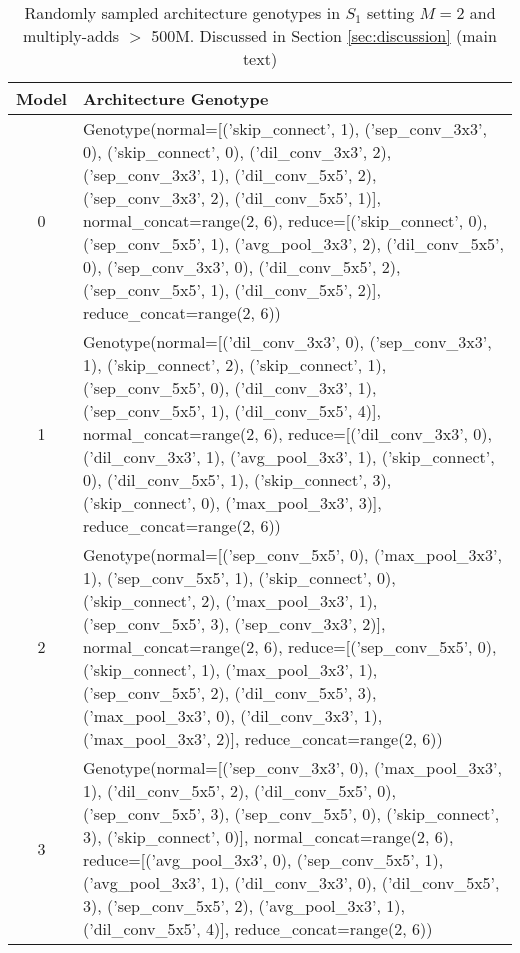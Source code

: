 \documentclass[runningheads]{llncs}
\begin{document}
\begin{table*}
	\begin{center}
		\caption{Randomly sampled architecture genotypes in $S_1$ setting $M=2$ and multiply-adds $>$ 500M. Discussed in Section \ref{sec:discussion} (main text)}
		\label{tab:random-m2500flops}
		\begin{footnotesize}
			\begin{tabular}{cp{11cm}}  
				\hline
				Model & Architecture Genotype  \\
				\hline
				0 & Genotype(normal=[('skip\_connect', 1), ('sep\_conv\_3x3', 0), ('skip\_connect', 0), ('dil\_conv\_3x3', 2), ('sep\_conv\_3x3', 1), ('dil\_conv\_5x5', 2), ('sep\_conv\_3x3', 2), ('dil\_conv\_5x5', 1)], normal\_concat=range(2, 6),
				reduce=[('skip\_connect', 0), ('sep\_conv\_5x5', 1), ('avg\_pool\_3x3', 2), ('dil\_conv\_5x5', 0), ('sep\_conv\_3x3', 0), ('dil\_conv\_5x5', 2), ('sep\_conv\_5x5', 1), ('dil\_conv\_5x5', 2)], reduce\_concat=range(2, 6))
				
				\\
				1 &  Genotype(normal=[('dil\_conv\_3x3', 0), ('sep\_conv\_3x3', 1), ('skip\_connect', 2), ('skip\_connect', 1), ('sep\_conv\_5x5', 0), ('dil\_conv\_3x3', 1), ('sep\_conv\_5x5', 1), ('dil\_conv\_5x5', 4)], normal\_concat=range(2, 6),
				reduce=[('dil\_conv\_3x3', 0), ('dil\_conv\_3x3', 1), ('avg\_pool\_3x3', 1), ('skip\_connect', 0), ('dil\_conv\_5x5', 1), ('skip\_connect', 3), ('skip\_connect', 0), ('max\_pool\_3x3', 3)], reduce\_concat=range(2, 6))
				
				\\
				2 & Genotype(normal=[('sep\_conv\_5x5', 0), ('max\_pool\_3x3', 1), ('sep\_conv\_5x5', 1), ('skip\_connect', 0), ('skip\_connect', 2), ('max\_pool\_3x3', 1), ('sep\_conv\_5x5', 3), ('sep\_conv\_3x3', 2)], normal\_concat=range(2, 6),
				reduce=[('sep\_conv\_5x5', 0), ('skip\_connect', 1), ('max\_pool\_3x3', 1), ('sep\_conv\_5x5', 2), ('dil\_conv\_5x5', 3), ('max\_pool\_3x3', 0), ('dil\_conv\_3x3', 1), ('max\_pool\_3x3', 2)], reduce\_concat=range(2, 6))
				
				\\
				3 & Genotype(normal=[('sep\_conv\_3x3', 0), ('max\_pool\_3x3', 1), ('dil\_conv\_5x5', 2), ('dil\_conv\_5x5', 0), ('sep\_conv\_5x5', 3), ('sep\_conv\_5x5', 0), ('skip\_connect', 3), ('skip\_connect', 0)], normal\_concat=range(2, 6),
				reduce=[('avg\_pool\_3x3', 0), ('sep\_conv\_5x5', 1), ('avg\_pool\_3x3', 1), ('dil\_conv\_3x3', 0), ('dil\_conv\_5x5', 3), ('sep\_conv\_5x5', 2), ('avg\_pool\_3x3', 1), ('dil\_conv\_5x5', 4)], reduce\_concat=range(2, 6))
				

\end{tabular}
\end{footnotesize}
\end{center}
\end{table*}
\end{document}
